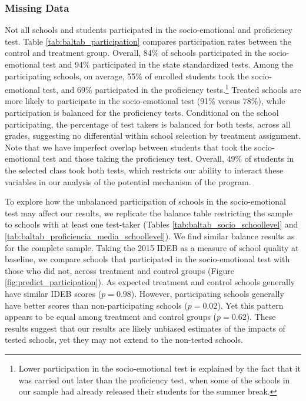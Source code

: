 \documentclass[11pt,a4paper]{article}
\begin{document}
\subsubsection*{Missing Data}
Not all schools and students participated in the socio-emotional and proficiency test. Table \ref{tab:baltab_participation} compares participation rates between the control and treatment group. Overall, 84\% of schools participated in the socio-emotional test and 94\% participated in the state standardized tests. Among the participating schools, on average, 55\% of enrolled students took the socio-emotional test, and 69\% participated in the proficiency tests.\footnote{Lower participation in the socio-emotional test is explained by the fact that it was carried out later than the proficiency test, when some of the schools in our sample had already released their students for the summer break.} Treated schools are more likely to participate in the socio-emotional test (91\% versus 78\%), while participation is balanced for the proficiency tests. Conditional on the school participating, the percentage of test takers is balanced for both tests, across all grades, suggesting no differential within school selection by treatment assignment. Note that we have imperfect overlap between students that took the socio-emotional test and those taking the proficiency test. Overall, 49\% of students in the selected class took both tests, which restricts our ability to interact these variables in our analysis of the potential mechanism of the program.

To explore how the unbalanced participation of schools in the socio-emotional test may affect our results, we replicate the balance table restricting the sample to schools with at least one test-taker (Tables \ref{tab:baltab_socio_schoollevel} and \ref{tab:baltab_proficiencia_media_schoollevel}). We find similar balance results as for the complete sample. Taking the 2015 IDEB as a measure of school quality at baseline, we compare schools that participated in the socio-emotional test with those who did not, across treatment and control groups (Figure \ref{fig:predict_participation}). As expected treatment and control schools generally have similar IDEB scores ($p=0.98$). However, participating schools generally have better scores than non-participating schools ($p=0.02$). Yet this pattern appears to be equal among treatment and control groups ($p=0.62$). These results suggest that our results are likely unbiased estimates of the impacts of tested schools, yet they may not extend to the non-tested schools.
\end{document}
